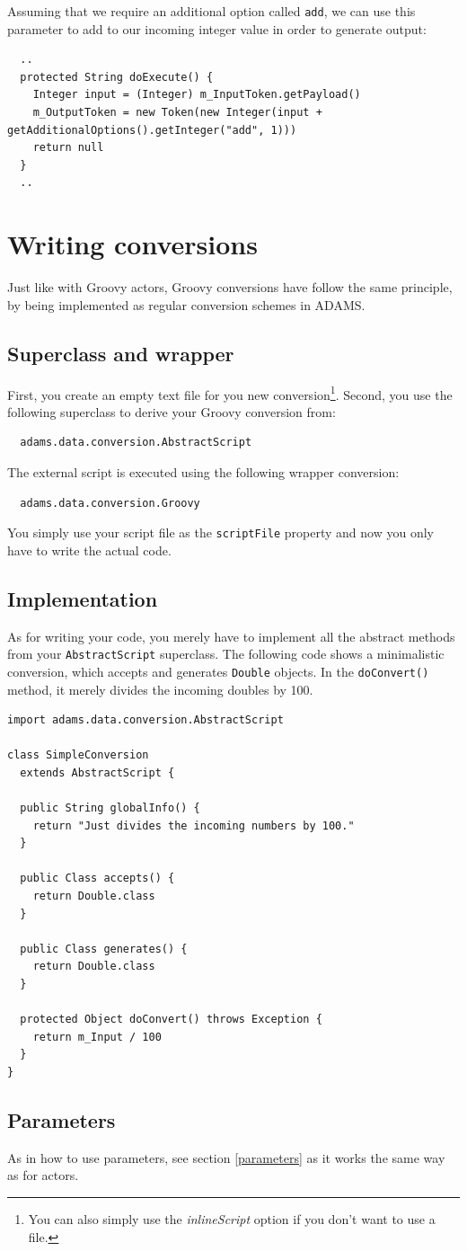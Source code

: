 \documentclass[a4paper]{book}
\begin{document}
Assuming that we require an additional option called \texttt{add}, we can use
this parameter to add to our incoming integer value in order to generate output:
{\small
\begin{verbatim}
  ..
  protected String doExecute() {
    Integer input = (Integer) m_InputToken.getPayload()
    m_OutputToken = new Token(new Integer(input + getAdditionalOptions().getInteger("add", 1)))
    return null
  }
  ..
\end{verbatim}
}

\chapter{Writing conversions}
Just like with Groovy actors, Groovy conversions have follow the same principle,
by being implemented as regular conversion schemes in ADAMS.

\section{Superclass and wrapper}
First, you create an empty text file for you new 
conversion\footnote{You can also simply use the \textit{inlineScript} option if you don't 
want to use a file.}. Second, you use the following superclass to derive your 
Groovy conversion from:
\begin{verbatim}
  adams.data.conversion.AbstractScript
\end{verbatim}
The external script is executed using the following wrapper conversion:
\begin{verbatim}
  adams.data.conversion.Groovy
\end{verbatim}
You simply use your script file as the \texttt{scriptFile} property and now you
only have to write the actual code.

\newpage
\section{Implementation}
As for writing your code, you merely have to implement all the abstract methods
from your \texttt{AbstractScript} superclass. The following code shows a
minimalistic conversion, which accepts and generates \texttt{Double}
objects. In the \texttt{doConvert()} method, it merely divides the incoming
doubles by 100.
\begin{verbatim}
import adams.data.conversion.AbstractScript

class SimpleConversion
  extends AbstractScript {

  public String globalInfo() {
    return "Just divides the incoming numbers by 100."
  }

  public Class accepts() {
    return Double.class
  }

  public Class generates() {
    return Double.class
  }

  protected Object doConvert() throws Exception {
    return m_Input / 100
  }
}
\end{verbatim}
\section{Parameters}
As in how to use parameters, see section \ref{parameters} as it works the
same way as for actors.



\end{document}
